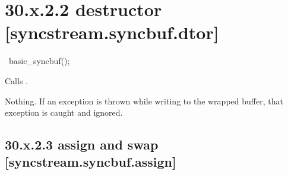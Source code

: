 \documentclass[ebook,11pt,article]{memoir}
\begin{document}
\section{30.x.2.2  destructor [syncstream.syncbuf.dtor]}

%
\begin{addedblock}
\begin{itemdecl}
~basic_syncbuf();
\end{itemdecl}

\begin{itemdescr}
\pnum
\effects
Calls .

\pnum
\throws
Nothing. 
If an exception is thrown while writing to the wrapped buffer, that exception is caught and ignored.

\end{itemdescr}

\end{addedblock}

\subsection{30.x.2.3  assign and swap [syncstream.syncbuf.assign]}

\end{document}
